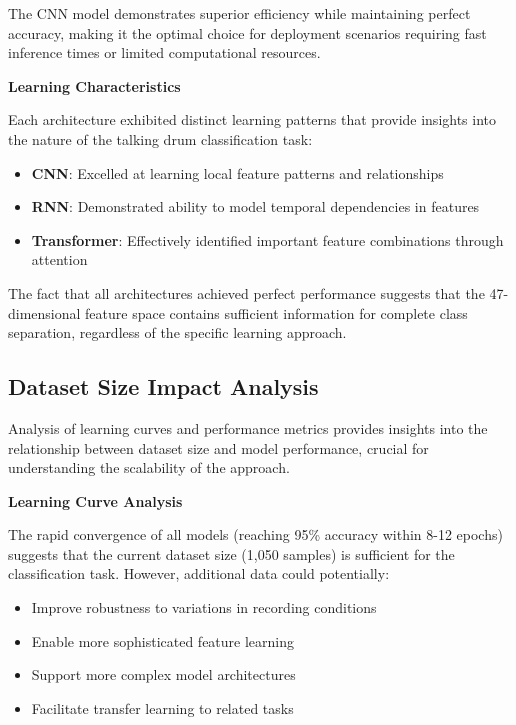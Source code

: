 \documentclass[12pt,a4paper]{article}
\begin{document}
The CNN model demonstrates superior efficiency while maintaining perfect accuracy, making it the optimal choice for deployment scenarios requiring fast inference times or limited computational resources.

\textbf{Learning Characteristics}

Each architecture exhibited distinct learning patterns that provide insights into the nature of the talking drum classification task:

\begin{itemize}
\item \textbf{CNN}: Excelled at learning local feature patterns and relationships
\item \textbf{RNN}: Demonstrated ability to model temporal dependencies in features
\item \textbf{Transformer}: Effectively identified important feature combinations through attention
\end{itemize}

The fact that all architectures achieved perfect performance suggests that the 47-dimensional feature space contains sufficient information for complete class separation, regardless of the specific learning approach.

\subsection{Dataset Size Impact Analysis}

Analysis of learning curves and performance metrics provides insights into the relationship between dataset size and model performance, crucial for understanding the scalability of the approach.

\textbf{Learning Curve Analysis}

The rapid convergence of all models (reaching 95\% accuracy within 8-12 epochs) suggests that the current dataset size (1,050 samples) is sufficient for the classification task. However, additional data could potentially:

\begin{itemize}
\item Improve robustness to variations in recording conditions
\item Enable more sophisticated feature learning
\item Support more complex model architectures
\item Facilitate transfer learning to related tasks
\end{itemize}
\end{document}
